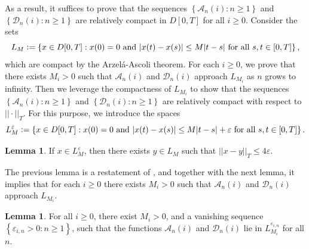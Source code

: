 \documentclass[a4paper, 12pt]{article}
\theoremstyle{definition}
\newtheorem{lemma}[theorem]{Lemma}
\newcommand{\norm}[1]{\left|\left|#1\right|\right|}
\newcommand{\set}[2]{\left\{#1 : #2\right\}}
\newcommand{\defeq}{\vcentcolon=}
\newcommand{\calA}{\mathcal{A}}
\newcommand{\calD}{\mathcal{D}}
\newcommand{\scdot}{{}\cdot{}}
\begin{document}
\begin{appendices}
	As a result, it suffices to prove that the sequences $\set{\calA_n(i)}{n \geq 1}$ and $\set{\calD_n(i)}{n \geq 1}$ are relatively compact in $D[0, T]$ for all $i \geq 0$. Consider the sets
	\begin{equation*}
		L_M \defeq \set{x \in D[0, T]}{x(0) = 0\ \text{and}\ |x(t) - x(s)| \leq M|t - s|\ \text{for all}\ s, t \in [0, T]},
	\end{equation*}
	which are compact by the Arzel\'a-Ascoli theorem. For each $i \geq 0$, we prove that there exists $M_i > 0$ such that $\calA_n(i)$ and $\calD_n(i)$ approach $L_{M_i}$ as $n$ grows to infinity. Then we leverage the compactness of $L_{M_i}$ to show that the sequences $\set{\calA_n(i)}{n \geq 1}$ and $\set{\calD_n(i)}{n \geq 1}$ are relatively compact with respect to $\norm{\scdot}_T$. For this purpose, we introduce the spaces
	\begin{equation*}
		L_M^\varepsilon \defeq \set{x \in D[0, T]}{x(0) = 0\ \text{and}\ |x(t) - x(s)| \leq M|t - s| + \varepsilon\ \text{for all}\ s, t \in [0, T]}.
	\end{equation*}
	
	\begin{lemma}
		\label{lem: lemma from bramson}
		If $x \in L_M^\varepsilon$, then there exists $y \in L_M$ such that $\norm{x - y}_T \leq 4\varepsilon$.
	\end{lemma}
	
	The previous lemma is a restatement of \cite[Lemma 4.2]{bramson1998state}, and together with the next lemma, it implies that for each $i \geq 0$ there exists $M_i > 0$ such that $\calA_n(i)$ and $\calD_n(i)$ approach $L_{M_i}$.
	
	\begin{lemma}
		\label{lem: approximate lipschitz property}
		For all $i \geq 0$, there exist $M_i > 0$, and a vanishing sequence $\set{\varepsilon_{i, n} > 0}{n \geq 1}$, such that the functions $\calA_n(i)$ and $\calD_n(i)$ lie in $L_{M_i}^{\varepsilon_{i, n}}$ for all $n$.
	\end{lemma}
	

\end{appendices}
\end{document}
